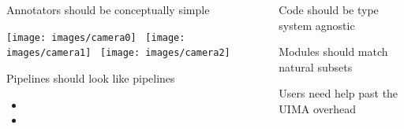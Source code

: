 \documentclass[final]{beamer}
\begin{document}
\begin{frame}{}
\begin{columns}[t]
\begin{column}{.45\linewidth}
\begin{block}{Annotators should be conceptually simple}
      \begin{center}
        \texttt{[image: images/camera0]}
        \,
        \texttt{[image: images/camera1]}
        \,
        \texttt{[image: images/camera2]}
      \end{center}
    \end{block}

    \begin{block}{Pipelines should look like pipelines}
      \begin{itemize}
      \item 
      \item 
      \end{itemize}
    \end{block}
    
  \end{column}


  \begin{column}{.45\linewidth}
    \begin{block}{Code should be type system agnostic}
    \end{block}

    \begin{block}{Modules should match natural subsets}
    \end{block}

    \begin{block}{Users need help past the UIMA overhead}
    \end{block}
    
   
  \end{column}

\end{columns}
\vfill
\end{frame}
\end{document}
